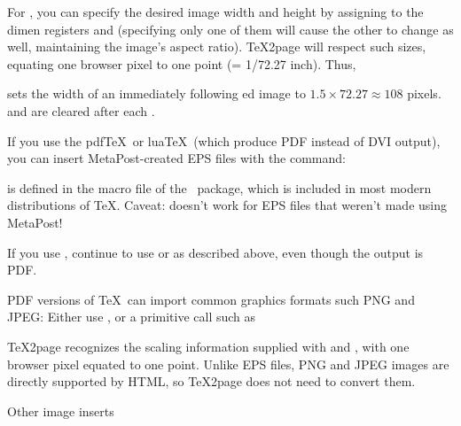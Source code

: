 {{{{{{{{{{{{{{

\centerline{}


\n For \p{\epsfbox}, you can specify the desired image
width and height by assigning to the dimen
registers \p{\epsfxsize} and \p{\epsfysize}
(specifying only one of them will cause the other to
change as well, maintaining the image's aspect ratio).
\TeX2page will respect such sizes, equating one browser
pixel to one point (= 1/72.27 inch).  Thus,

\p{
\epsfxsize=1.5in
}

\n  sets the width of an immediately following \p{\epsfbox}ed image to
$1.5 \times 72.27 \approx 108$
pixels.
\p{\epsfxsize} and
\p{\epsfysize} are cleared after each
\p{\epsfbox}.


If you use the pdf\TeX\ or lua\TeX\ (which produce PDF
instead of DVI output), you can insert
MetaPost-created EPS files with the
\p{\convertMPtoPDF} command:


\n \p{\convertMPtoPDF} is defined in the macro file
 of the \ConTeXt\ package,
which is included in most modern distributions of \TeX.
Caveat: \p{\convertMPtoPDF} doesn't work for EPS files
that weren't made using MetaPost!

If you use \XeTeX, continue to use  or  as
described above, even though the output is PDF.


PDF versions of \TeX\ can import common graphics formats
such PNG and JPEG: Either use , or a primitive call
such as


\TeX2page recognizes the scaling information supplied with \p{\pdfximage}
and ,  with one browser pixel
equated to one point.  Unlike EPS files, PNG and JPEG images are directly
supported by HTML, so \TeX2page does not need to convert them.

\beginsection Other image inserts

}}}}}}}}}}}}}}
